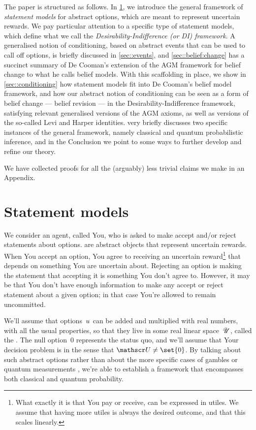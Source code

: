\documentclass[preprint]{isipta2025}
\begin{document}
The paper is structured as follows.
In \cref{sec::accept:reject}, we introduce the general framework of \emph{statement models} for abstract options, which are meant to represent uncertain rewards.
We pay particular attention to a specific type of statement models, which define what we call the \emph{Desirability-Indifference (or DI) framework}.
A generalised notion of conditioning, based on abstract events that can be used to call off options, is briefly discussed in \cref{sec::events}, and \cref{sec::belief:change} has a succinct summary of De Cooman's extension of the AGM framework for belief change to what he calls belief models.
With this scaffolding in place, we show in \cref{sec::conditioning} how statement models fit into De Cooman's belief model framework, and how our abstract notion of conditioning can be seen as a form of belief change --- belief revision --- in the Desirability-Indifference framework, satisfying relevant generalised versions of the AGM axioms, as well as versions of the so-called Levi and Harper identities.
 very briefly discusses two specific instances of the general framework, namely classical and quantum probabilistic inference, and in the Conclusion we point to some ways to further develop and refine our theory.

We have collected proofs for all the (arguably) less trivial claims we make in an Appendix.

\section{Statement models}\label{sec::accept:reject}
We consider an agent, called You, who is asked to make accept and/or reject statements about options.
 are abstract objects that represent uncertain rewards.
When You accept an option, You agree to receiving an uncertain reward\footnote{What exactly it is that You pay or receive, can be expressed in utiles. We assume that having more utiles is always the desired outcome, and that this scales linearly.} that depends on something You are uncertain about.
Rejecting an option is making the statement that accepting it is something You don't agree to.
However, it may be that You don't have enough information to make any accept or reject statement about a given option; in that case You're allowed to remain uncommitted.

We'll assume that options~\(u_{}\) can be added and multiplied with real numbers, with all the usual properties, so that they live in some real linear space~\(\mathscr{U}\), called the .
The null option~\(0\) represents the status quo, and we'll assume that Your decision problem is  in the sense that \(\opts\neq\set{0}\).
By talking about such abstract options rather than about the more specific cases of gambles \cite{quaeghebeur2015:statement} or quantum measurements \cite{devos2023:indistinguishability,benavoli2016:quantum_2016}, we're able to establish a framework that encompasses both classical and quantum probability.
\end{document}
